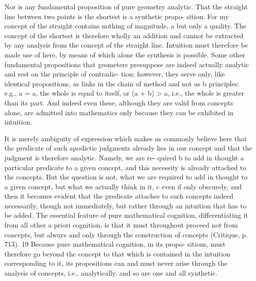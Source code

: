 Nor is any fundamental proposition of pure geometry analytic. That
the straight line between two points is the shortest is a synthetic propo-
sition. For my concept of the straight contains nothing of magnitude, a
but only a quality. The concept of the shortest is therefore wholly an
addition and cannot be extracted by any analysis from the concept of the
straight line. Intuition must therefore be made use of here, by means of
which alone the synthesis is possible.
Some other fundamental propositions that geometers presuppose
are indeed actually analytic and rest on the principle of contradic-
tion; however, they serve only, like identical propositions, as links in
the chain of method and not as b principles: e.g., a = a, the whole is
equal to itself, or (a + b) > a, i.e., the whole is greater than its part.
And indeed even these, although they are valid from concepts alone,
are admitted into mathematics only because they can be exhibited in
intuition.

It is merely ambiguity of expression which makes us commonly believe
here that the predicate of such apodictic judgments already lies in our
concept and that the judgment is therefore analytic. Namely, we are re-
quired b to add in thought a particular predicate to a given concept, and
this necessity is already attached to the concepts. But the question is not,
what we are required to add in thought to a given concept, but what we
actually think in it, c even if only obscurely, and then it becomes evident
that the predicate attaches to such concepts indeed necessarily, though
not immediately, but rather through an intuition that has to be added.
The essential feature of pure mathematical cognition, differentiating
it from all other a priori cognition, is that it must throughout proceed not
from concepts, but always and only through the construction of concepts
(Critique, p. 713). 19 Because pure mathematical cognition, in its propo-
sitions, must therefore go beyond the concept to that which is contained
in the intuition corresponding to it, its propositions can and must never
arise through the analysis of concepts, i.e., analytically, and so are one
and all synthetic.

